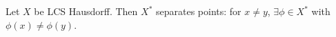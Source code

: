 Let $X$ be LCS Hausdorff. Then $X^*$ separates points: for $x\neq y$, $\exists\phi\in X^*$ with $\phi(x)\neq\phi(y)$.
